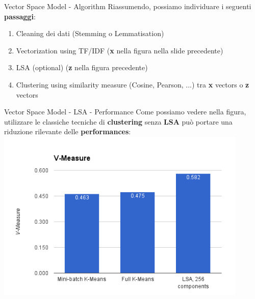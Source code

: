 \documentclass[british]{beamer}
\begin{document}
\begin{frame}{Vector Space Model - Algorithm}
	Riassumendo, possiamo individuare i seguenti \textbf{passaggi}:
	\begin{enumerate}
		\item Cleaning dei dati (Stemming o Lemmatisation)
		\item Vectorization using TF/IDF (\textbf{x} nella figura nella slide precedente)
		\item LSA (optional) (\textbf{z} nella figura precedente)
		\item Clustering using similarity measure (Cosine, Pearson, ...) tra \textbf{x} vectors o \textbf{z} vectors
	\end{enumerate}
\end{frame}

\begin{frame}{Vector Space Model - LSA - Performance}
	Come possiamo vedere nella figura, utilizzare le classiche tecniche di \textbf{clustering} senza \textbf{LSA} pu\`{o} portare una riduzione rilevante delle \textbf{performances}:
	\includegraphics[width=0.9\textwidth, height=0.7\textheight]{./Imgs/LSAperf}
\end{frame}
\end{document}
